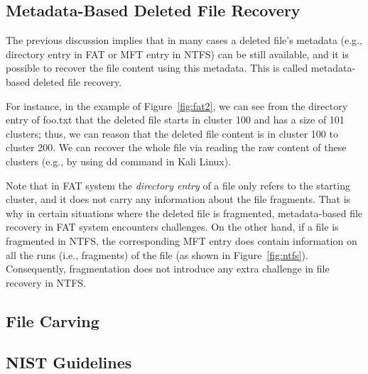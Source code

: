 \subsection{Metadata-Based Deleted File Recovery}
\begin{paraphrase}
 The previous discussion implies that in many cases a deleted file's metadata 
(e.g., directory entry in FAT or MFT entry in NTFS) can be still available, 
and it is possible to recover the file content using this metadata. 
This is called metadata-based deleted file recovery.

For instance, in the example of Figure~\ref{fig:fat2},
we can see from the directory entry of foo.txt that 
the deleted file starts in cluster 100 and has a size of 101 clusters;
thus, we can reason that the deleted file content is in cluster 100 to cluster 200.
We can recover the whole file via reading the raw content of these clusters (e.g., by using dd command in Kali Linux). 

Note that in FAT system the \emph{directory entry} of a file only refers to the starting cluster, and it does not carry any information about the file fragments.
That is why in certain situations where the deleted file is fragmented, metadata-based file recovery in FAT system encounters challenges.
On the other hand, if a file is fragmented in NTFS, the corresponding MFT entry does contain information on all the runs (i.e., fragments) of the file
(as shown in Figure~\ref{fig:ntfs}). Consequently, fragmentation does not introduce any extra challenge in file recovery in NTFS.
\end{paraphrase}

\subsection{File Carving}


\subsection{NIST Guidelines}
